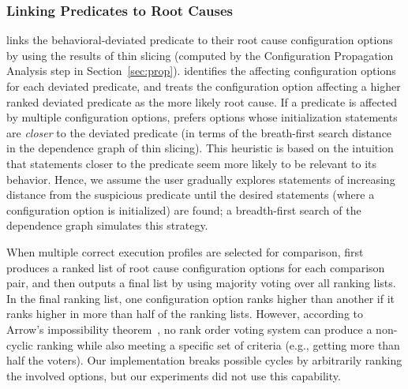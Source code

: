 \subsubsection{Linking Predicates to Root Causes}
\label{sec:linking}


\ourtool links the behavioral-deviated
predicate to their root cause configuration options
by using the results of thin slicing (computed by the Configuration Propagation
Analysis step in Section~\ref{sec:prop}).
\ourtool identifies 
the affecting configuration options for each deviated predicate,
and treats the configuration option
affecting a higher ranked deviated predicate as the more likely
root cause. If a predicate is affected by multiple
configuration options, \ourtool prefers options whose initialization
statements are \textit{closer} to the
deviated predicate (in terms of the breath-first search
distance in the dependence graph of thin slicing).
This heuristic is based on the intuition that statements closer to the
predicate seem more likely to be relevant to its behavior.
Hence, we assume the user gradually explores statements of
increasing distance from the suspicious predicate until
the desired statements (where a configuration
option is initialized) are found; a breadth-first
search of the dependence graph simulates this strategy.


When multiple correct execution profiles are selected for comparison,
\ourtool first produces a ranked list of root cause
configuration options for each comparison pair, and then outputs
a final list by using majority voting over all ranking lists.
In the final ranking list, one configuration option ranks higher
than another if it ranks higher in more than half of the ranking lists.
However, according to Arrow's impossibility theorem~\cite{Fishburn1970103},
no rank order voting system can produce a non-cyclic ranking while also
meeting a specific set of criteria (e.g., getting more than half the voters).
Our implementation breaks possible cycles by arbitrarily ranking the
involved options, but our experiments did not use this capability.



